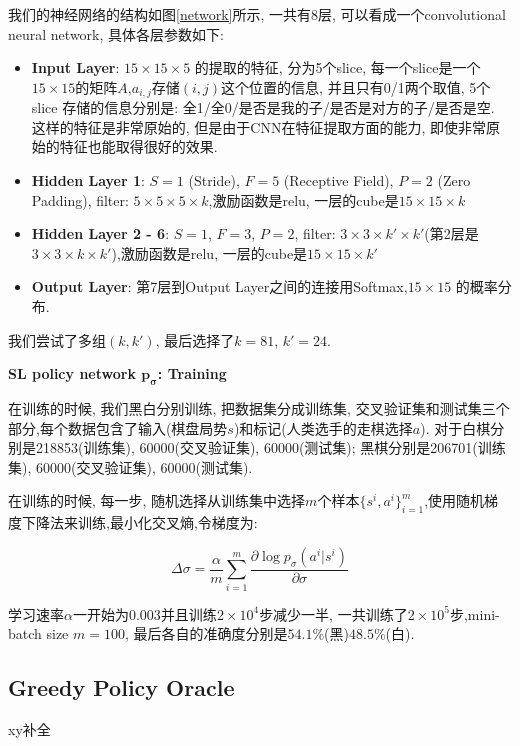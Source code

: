 \documentclass[twocolumn]{article}
\begin{document}
我们的神经网络的结构如图\ref{network}所示, 一共有8层, 可以看成一个convolutional neural network, 具体各层参数如下: 

\begin{itemize}
	\item \textbf{Input Layer}: $15 \times 15 \times 5$ 的提取的特征, 分为5个slice, 每一个slice是一个$15 \times 15$的矩阵$A$,$a_{i,j}$存储$(i, j)$这个位置的信息, 并且只有0/1两个取值, 5个slice 存储的信息分别是: 全1/全0/是否是我的子/是否是对方的子/是否是空. 这样的特征是非常原始的, 但是由于CNN在特征提取方面的能力, 即使非常原始的特征也能取得很好的效果. 
	\item \textbf{Hidden Layer 1}: $S = 1$ (Stride), $F = 5$ (Receptive Field), $P = 2$ (Zero Padding), filter: $5 \times 5 \times 5 \times k$,激励函数是relu, 一层的cube是$15 \times 15 \times k$
	\item \textbf{Hidden Layer 2 - 6}: $S = 1$, $F = 3$, $P = 2$, filter: $3 \times 3 \times k' \times k'$(第2层是$3 \times 3 \times k \times k'$),激励函数是relu, 一层的cube是$15 \times 15 \times k'$
	\item \textbf{Output Layer}: 第7层到Output Layer之间的连接用Softmax,$15 \times 15$ 的概率分布.
\end{itemize}

我们尝试了多组$(k, k')$, 最后选择了$k = 81$, $k' = 24$.

\noindent \textbf{SL policy network $\bm{p_\sigma}$: Training}

在训练的时候, 我们黑白分别训练, 把数据集分成训练集, 交叉验证集和测试集三个部分,每个数据包含了输入(棋盘局势$s$)和标记(人类选手的走棋选择$a$). 对于白棋分别是218853(训练集), 60000(交叉验证集), 60000(测试集); 黑棋分别是206701(训练集), 60000(交叉验证集), 60000(测试集).

在训练的时候, 每一步, 随机选择从训练集中选择$m$个样本$\{s^i, a^i\}_{i=1}^m$,使用随机梯度下降法来训练,最小化交叉熵,令梯度为: 

\[
\Delta\sigma = \frac{\alpha}{m} \sum_{i=1}^{m} \frac{\partial\log p_\sigma(a^i|s^i)}{\partial \sigma}
\]

学习速率$\alpha$一开始为$0.003$并且训练$2 \times 10^4$步减少一半, 一共训练了$2 \times 10^5$步,mini-batch size $m = 100$, 最后各自的准确度分别是$54.1\%$(黑)$48.5\%$(白).

\subsection{Greedy Policy Oracle}

\textcolor[rgb]{1,0,0}{xy补全}
\end{document}

